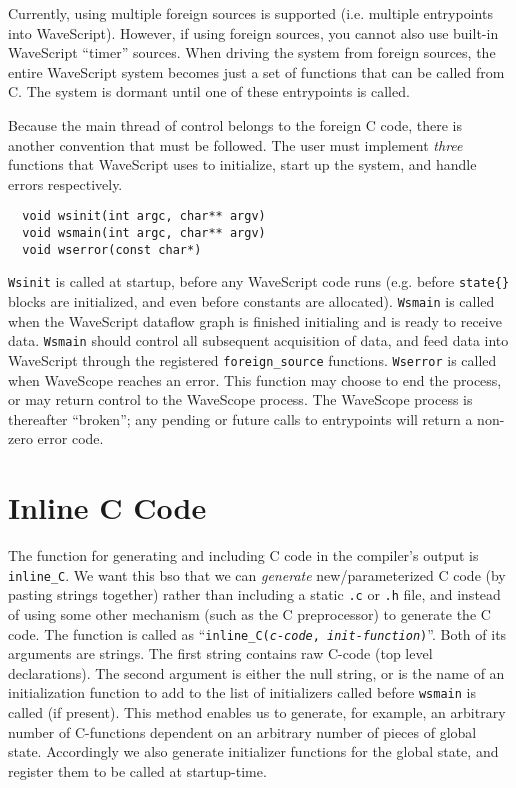 Currently, using multiple foreign sources is supported (i.e. multiple
entrypoints into WaveScript).  However, if using foreign sources, you
cannot also use built-in WaveScript ``timer'' sources.  When driving
the system from foreign sources, the entire WaveScript system becomes
just a set of functions that can be called from C.  The system is
dormant until one of these entrypoints is called.

Because the main thread of control belongs to the foreign C code,
there is another convention that must be followed.  The user must implement
{\em three} functions that WaveScript uses to initialize, start up the
system, and handle errors respectively.

\begin{verbatim}
  void wsinit(int argc, char** argv)
  void wsmain(int argc, char** argv)
  void wserror(const char*)
\end{verbatim}

{\tt Wsinit} is called at startup, before any WaveScript code runs
(e.g. before {\tt state\{\}} blocks are initialized, and even before
constants are allocated).  {\tt Wsmain} is called when the WaveScript
dataflow graph is finished initialing and is ready to receive data.
{\tt Wsmain} should control all subsequent acquisition of data, and
feed data into WaveScript through the registered {\tt foreign\_source}
functions.  {\tt Wserror} is called when WaveScope reaches an error.
This function may choose to end the process, or may return control to
the WaveScope process.  The WaveScope process is thereafter
``broken''; any pending or future calls to entrypoints will return a
non-zero error code.

\section{Inline C Code}

The function for generating and including C code in the compiler's
output is {\tt inline\_C}.  We want this bso that we can
{\em generate} new/parameterized C code (by pasting strings together) rather than 
including a static {\tt .c} or {\tt .h} file, and instead of using
some other mechanism (such as the C preprocessor) to generate the C code.
The function  is called as ``{\tt inline\_C({\em c-code},
{\em init-function})}''.  Both of its arguments are strings.  The first
string contains raw C-code (top level declarations).  The second
argument is either the null string, or is the name of an
initialization function to add to the list of initializers called
before {\tt wsmain} is called (if present).  This method enables us to
generate, for example, an arbitrary number of C-functions dependent on
an arbitrary number of pieces of global state.  Accordingly we also
generate initializer functions for the global state, and register them
to be called at startup-time.

